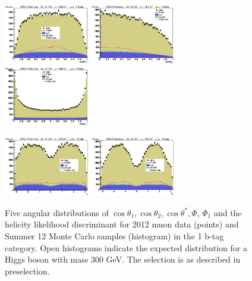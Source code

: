 \begin{figure}[thb!]
\centerline{
\includegraphics[width=0.33\textwidth]{presentation/defense/images/preselection/1/mu/costheta1.eps}
\includegraphics[width=0.33\textwidth]{presentation/defense/images/preselection/1/mu/costheta2.eps}
\includegraphics[width=0.33\textwidth]{presentation/defense/images/preselection/1/mu/costhetast.eps}
}
\centerline{
\includegraphics[width=0.33\textwidth]{presentation/defense/images/preselection/1/mu/phi.eps}
\includegraphics[width=0.33\textwidth]{presentation/defense/images/preselection/1/mu/phi1.eps}
}
\caption{
Five angular distributions of $\cos\theta_1, \cos\theta_2, \cos\theta^*, \Phi$, $\Phi_1$ and the helicity likelihood discriminant for 2012 muon data (points) and Summer 12 Monte Carlo samples (histogram) in the 1 b-tag category.  Open histograms indicate the expected distribution for a Higgs boson with mass 300 GeV. The selection is as described in preselection.
\label{helicityDistDataMCM1}}
\end{figure}
